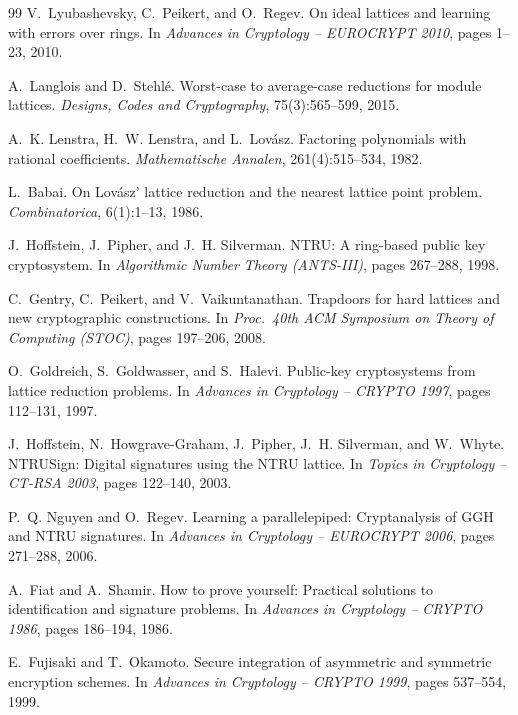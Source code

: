 \begin{thebibliography}{99}
 V.~Lyubashevsky, C.~Peikert, and O.~Regev.
\newblock On ideal lattices and learning with errors over rings.
\newblock In \emph{Advances in Cryptology -- EUROCRYPT 2010}, pages 1--23, 2010.

 A.~Langlois and D.~Stehl\'{e}.
\newblock Worst-case to average-case reductions for module lattices.
\newblock \emph{Designs, Codes and Cryptography}, 75(3):565--599, 2015.

 A.~K. Lenstra, H.~W. Lenstra, and L.~Lov\'{a}sz.
\newblock Factoring polynomials with rational coefficients.
\newblock \emph{Mathematische Annalen}, 261(4):515--534, 1982.

 L.~Babai.
\newblock On Lov\'{a}sz' lattice reduction and the nearest lattice point problem.
\newblock \emph{Combinatorica}, 6(1):1--13, 1986.

 J.~Hoffstein, J.~Pipher, and J.~H. Silverman.
\newblock NTRU: A ring-based public key cryptosystem.
\newblock In \emph{Algorithmic Number Theory (ANTS-III)}, pages 267--288, 1998.

 C.~Gentry, C.~Peikert, and V.~Vaikuntanathan.
\newblock Trapdoors for hard lattices and new cryptographic constructions.
\newblock In \emph{Proc.\ 40th ACM Symposium on Theory of Computing (STOC)}, pages 197--206, 2008.

 O.~Goldreich, S.~Goldwasser, and S.~Halevi.
\newblock Public-key cryptosystems from lattice reduction problems.
\newblock In \emph{Advances in Cryptology -- CRYPTO 1997}, pages 112--131, 1997.

 J.~Hoffstein, N.~Howgrave-Graham, J.~Pipher, J.~H. Silverman, and W.~Whyte.
\newblock NTRUSign: Digital signatures using the NTRU lattice.
\newblock In \emph{Topics in Cryptology -- CT-RSA 2003}, pages 122--140, 2003.

 P.~Q. Nguyen and O.~Regev.
\newblock Learning a parallelepiped: Cryptanalysis of GGH and NTRU signatures.
\newblock In \emph{Advances in Cryptology -- EUROCRYPT 2006}, pages 271--288, 2006.

 A.~Fiat and A.~Shamir.
\newblock How to prove yourself: Practical solutions to identification and signature problems.
\newblock In \emph{Advances in Cryptology -- CRYPTO 1986}, pages 186--194, 1986.

 E.~Fujisaki and T.~Okamoto.
\newblock Secure integration of asymmetric and symmetric encryption schemes.
\newblock In \emph{Advances in Cryptology -- CRYPTO 1999}, pages 537--554, 1999.


\end{thebibliography}
